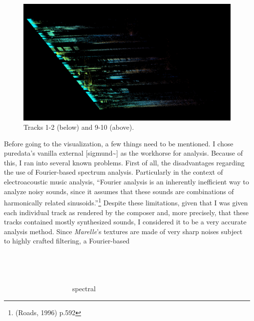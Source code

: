 \documentclass{article}
\begin{document}
\begin{figure}
\begin{multicols}{2}
    \includegraphics[width=\linewidth]{preset-50-2.jpg}%
\end{multicols}
\caption{Tracks 1-2 (below) and 9-10 (above).}
\end{figure}




\newpage

Before going to the visualization, a few things need to be mentioned. I chose puredata's vanilla external [sigmund\~{}] as the workhorse for analysis. Because of this, I ran into several known problems. First of all, the disadvantages regarding the use of Fourier-based spectrum analysis. Particularly in the context of electroacoustic music analysis, ``Fourier analysis is an inherently inefficient way to analyze noisy sounds, since it assumes that these sounds are combinations of harmonically related sinusoids.''\footnote{(Roads, 1996) p.592} Despite these limitations, given that I was given each individual track as rendered by the composer and, more precisely, that these tracks contained mostly synthesized sounds, I considered it to be a very accurate analysis method. Since \textit{Marelle}'s textures are made of very sharp noises subject to highly crafted filtering, a Fourier-based \ \ \ \ \ \ \ \ \ \ \ \ \ \ \ \ \ \ \ \ \ \ \ \ \ \ \ \ \ \ \ \ \ \ \ \ \ \ \ \ \ \ \ \ \ \ \ \ \ \ \ \ \ \ \ \ \ \ \ \ \ \ \ \ \ \ \ \ \ \ \ \ \ \ \ \ \ \ \ \ \ \ \ \ \ \ \ \ \ \ \ \ \ \ \ \ \ \ \ \ \ \ \ \ \ \ \ \ \ \ \ \ \ \ \ \ \ \ \ \ \ \ \ \ \ \ \ \ \ \ \ \ \ \ \ \ \ \ \ \ \ \ \ \ \ \ \ \ \ \ \ \ \ \ \ \ \ \ \ \ \ \ \ \ \ \ \ \ \ \ \ \ \ \ \ \ \ \ \ \ \ \ \ \ \ \ \ \ \ \ \ \ \ \ \ \ \ \ \ \ \ \ \ \ \ \ \ \ \ \ \ \ \ \ \ \ \ \ \ \ \ \ \ \ \ \ \ \ \ \ \ \ \ \ \ \ \ \ \ \ \ \ \ \ \ \ \ \ \ \ \ \ \ \ \ \ \ \ \ \ \ \ \ \ \ \ \ \ \ \ \ \ \ \ \ \ \ \ \ \ \ \ \ \ \ \ \ \ \ \ \ \ \ \ \ \ \ \ \ \ \ \ \ \ \ \ \ \ spectral
\end{document}
